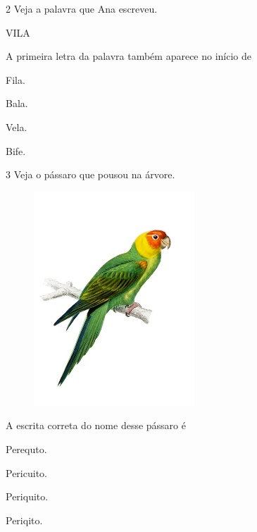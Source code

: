 \num{2} Veja a palavra que Ana escreveu.

\begin{myquote}
VILA
\end{myquote}

A primeira letra da palavra também aparece no início de 

\begin{escolha}
\item Fila.

\item Bala.

\item Vela.

\item Bife.
\end{escolha}

\pagebreak
\num{3} Veja o pássaro que pousou na árvore.

\begin{figure}[htpb!]
\centering
\includegraphics[width=.4\textwidth]{media/image165.jpeg}
\end{figure}


A escrita correta do nome desse pássaro é

\begin{multicols}{2}
\begin{escolha}
\item Perequto.

\item Pericuito.

\item Periquito.

\item Periqito.
\end{escolha}
\end{multicols}

